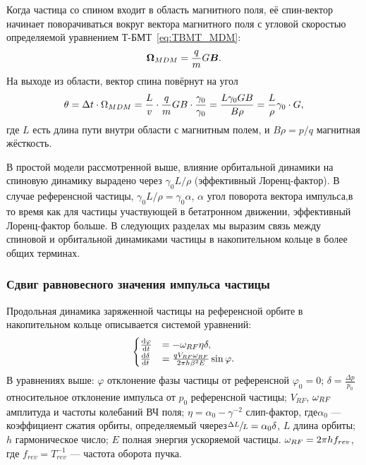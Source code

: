 \documentclass{report}
\begin{document}
Когда частица со спином входит в область магнитного поля, её спин-вектор
начинает поворачиваться вокруг вектора магнитного поля с угловой
скоростью определяемой уравнением Т-БМТ~\eqref{eq:TBMT_MDM}:
\begin{equation*}
  \boldsymbol{\Omega}_{MDM} = \frac qm G\boldsymbol B.
\end{equation*}
На выходе из области, вектор спина повёрнут на угол
\begin{equation*}
  \theta = \Delta t\cdot\Omega_{MDM} = \frac Lv \cdot \frac qm GB\cdot \frac{\gamma_0}{\gamma_0} = \frac{L\gamma_0 GB}{B\rho} = \frac L\rho\gamma_0\cdot G,
\end{equation*}
где $L$ есть длина пути внутри области с магнитным полем, и $B\rho =
p/q$ магнитная жёсткость.

В простой модели рассмотренной выше, влияние орбитальной динамики на
спиновую динамику вырадено через $\gamma_0 L/\rho$ (эффективный
Лоренц-фактор). В случае референсной частицы, $\gamma_0L/\rho =
\gamma_0\alpha$, $\alpha$ угол поворота вектора импульса,в то время
как для частицы участвующей в бетатронном движении, эффективный
Лоренц-фактор больше. В следующих разделах мы выразим связь между
спиновой и орбитальной динамиками частицы в накопительном кольце в
более общих терминах.

\subsubsection{Сдвиг равновесного значения импульса частицы}
Продольная динамика заряженной частицы на референсной орбите в
накопительном кольце описывается системой уравнений:
\begin{equation*}
  \begin{cases}
    \frac{\mathrm{d} {\varphi}}{\mathrm{d} t} &= -\omega_{RF}\eta\delta, \\
    \frac{\mathrm{d} {\delta}}{\mathrm{d} t} &= \frac{q V_{RF}\omega_{RF}}{2\pi h\beta^2E}\sin\varphi.
  \end{cases}
\end{equation*}
В уравнениях выше: $\varphi$ отклонение фазы частицы от референсной
$\varphi_0 = 0$; $\delta = \frac{\Delta p}{p_0}$ относительное
отклонение импульса от $p_0$ референсной частицы; $V_{RF}$, $\omega_{RF}$
амплитуда и частоты колебаний ВЧ поля; $\eta = \alpha_0 - \gamma^{-2}$
слип-фактор, где$\alpha_0$ --- коэффициент сжатия орбиты, определяемый
чяерез$\sfrac{\Delta L}{L} = \alpha_0\delta$, $L$ длина орбиты; $h$
гармоническое число; $E$ полная энергия ускоряемой частицы. $\omega_{RF} =
2\pi h f_{rev}$, где $f_{rev}=T_{rev}^{-1}$ --- частота оборота пучка.
\end{document}
